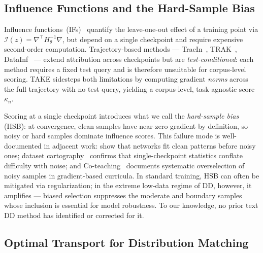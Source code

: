 \subsection{Influence Functions and the Hard-Sample Bias} \label{ch5:sec:02-related-influence}

\begin{foldable} %
    Influence functions~(IFs)~\cite{cook1982residuals,koh2017understanding} quantify the leave-one-out effect of a training point via $\mathcal{I}(z) = \nabla^\top H_\theta^{-1} \nabla$, but depend on a single checkpoint and require expensive second-order computation.
    Trajectory-based methods --- TracIn~\cite{pruthi2020estimating}, TRAK~\cite{park2023trak}, DataInf~\cite{kwon2023datainf} --- extend attribution across checkpoints but are \emph{test-conditioned}: each method requires a fixed test query and is therefore unsuitable for corpus-level scoring.
    TAKE sidesteps both limitations by computing gradient \emph{norms} across the full trajectory with no test query, yielding a corpus-level, task-agnostic score $\kappa_n$.
\end{foldable}

\begin{foldable} %
    Scoring at a single checkpoint introduces what we call the \emph{hard-sample bias} (HSB): at convergence, clean samples have near-zero gradient by definition, so noisy or hard samples dominate influence scores.
    This failure mode is well-documented in adjacent work: \cite{arpit2017closer} show that networks fit clean patterns before noisy ones; dataset cartography~\cite{swayamdipta2020dataset} confirms that single-checkpoint statistics conflate difficulty with noise; and Co-teaching~\cite{han2018co} documents systematic overselection of noisy samples in gradient-based curricula.
    In standard training, HSB can often be mitigated via regularization; in the extreme low-data regime of DD, however, it amplifies --- biased selection suppresses the moderate and boundary samples whose inclusion is essential for model robustness.
    To our knowledge, no prior text DD method has identified or corrected for it.
\end{foldable}


\subsection{Optimal Transport for Distribution Matching} \label{ch5:sec:02-related-ot}

